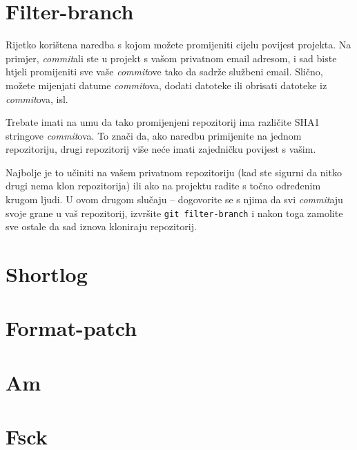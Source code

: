 \TODO

\section*{Filter-branch}

Rijetko korištena naredba s kojom možete promijeniti cijelu povijest projekta.
Na primjer, \emph{commit}ali ste u projekt s vašom privatnom email adresom, i sad biste htjeli promijeniti sve vaše \emph{commit}ove tako da sadrže službeni email.
Slično, možete mijenjati datume \emph{commit}ova, dodati datoteke ili obrisati datoteke iz \emph{commit}ova, isl.

Trebate imati na umu da tako promijenjeni repozitorij ima različite SHA1 stringove \emph{commit}ova.
To znači da, ako naredbu primijenite na jednom repozitoriju, drugi repozitorij više neće imati zajedničku povijest s vašim.

Najbolje je to učiniti na vašem privatnom repozitoriju (kad ste sigurni da nitko drugi nema klon repozitorija) ili ako na projektu radite s točno određenim krugom ljudi.
U ovom drugom slučaju -- dogovorite se s njima da svi \emph{commit}aju svoje grane u vaš repozitorij, izvršite \verb+git filter-branch+ i nakon toga zamolite sve ostale da sad iznova kloniraju repozitorij.

\section*{Shortlog}

\TODO

\section*{Format-patch}

\TODO

\section*{Am}

\TODO

\section*{Fsck}

\TODO

